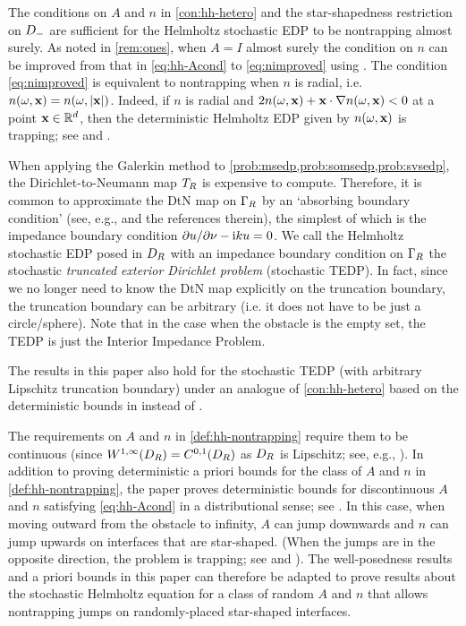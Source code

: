 The conditions on $A$ and $n$ in \cref{con:hh-hetero} and the star-shapedness restriction
on $D_{-}$ are sufficient for the Helmholtz stochastic EDP to be nontrapping almost surely. As noted in \cref{rem:ones}, when $A=I$ almost surely the condition on $n$  can be improved  from that in \eqref{eq:hh-Acond} to \eqref{eq:nimproved} using \cite[Theorem 2.19(ii)]{GrPeSp:19}.
The condition \eqref{eq:nimproved} is equivalent  to nontrapping when $n$ is radial, i.e. $n(\omega,\bx)=
n(\omega,\abs{\bx})$. Indeed, if $n$ is radial and $2n(\omega,\mathbf{x})+ \mathbf{x} \cdot\nabla n(\omega,\mathbf{x})<0$ at a point $\mathbf{x} \in \mathbb R^{d}$,
then the deterministic Helmholtz EDP given by $n(\omega,\mathbf{x})$ is trapping; see \cite{Ra:71} and \cite[Theorem 7.7]{GrPeSp:19}.
\ere

\label{rem:tedp}
When applying the Galerkin method to \cref{prob:msedp,prob:somsedp,prob:svsedp}, the Dirichlet-to-Neumann map $T_{R}$ is expensive to compute. Therefore, it is
common to approximate the DtN map on $\Gamma_{R}$ by an `absorbing
boundary condition' (see, e.g., \cite[Section 3.3]{Ih:98} and the references
therein), the  simplest of which is the impedance boundary condition
$\partial u/\partial \nu - \mathrm{i} k u=0$. We call the Helmholtz stochastic EDP posed in $D_{R}$ with
an impedance boundary condition on $\Gamma_{R}$ the stochastic \emph{truncated
exterior Dirichlet problem} (stochastic TEDP). In fact, since we no longer need to know
the DtN map explicitly on the truncation boundary, the truncation
boundary can be arbitrary (i.e. it does not have to be just a circle/sphere). Note that in the case when the obstacle is the empty set, the TEDP is just the Interior Impedance Problem.

The results in this paper also hold for the stochastic TEDP (with arbitrary Lipschitz truncation boundary) under an analogue of \cref{con:hh-hetero} based on the deterministic bounds in \cite[Theorem A.6(i)]{GrPeSp:19} instead of \cite[Theorem 2.5]{GrPeSp:19}.
\ere

\label{rem:jumps}
The requirements on $A$ and $n$ in \cref{def:hh-nontrapping} require them to be continuous (since  $\WoiDR = \CzoDR$ as $D_{R}$ is Lipschitz; see, e.g., \cite[Section 4.2.3, Theorem 5]{EvGa:92}). In addition to proving deterministic a priori bounds for the class of $A$ and $n$ in \cref{def:hh-nontrapping}, the paper \cite{GrPeSp:19} proves deterministic bounds for discontinuous $A$ and $n$ satisfying \eqref{eq:hh-Acond} in a distributional sense; see \cite[Theorem 2.7]{GrPeSp:19}. In this case, when moving outward from the obstacle to infinity,  $A$ can jump downwards and $n$ can
jump upwards on interfaces that are star-shaped. (When the jumps are in the opposite direction, the problem is trapping; see \cite{PoVo:99a} and \cite[Section 6]{MoSp:19}). The
well-posedness results and a priori bounds in this paper can therefore be adapted to prove results about the stochastic Helmholtz equation
for a class of random $A$ and $n$ that allows nontrapping jumps on randomly-placed star-shaped interfaces.
\ere

